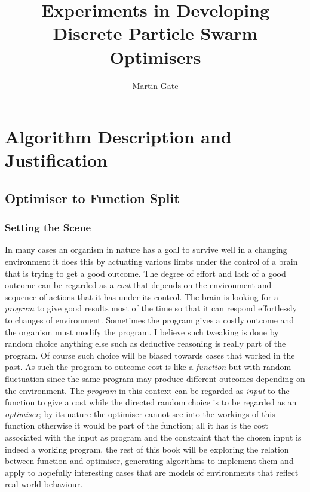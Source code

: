 \documentclass[a4paper,oneside,english]{book}
\numberwithin{equation}{section}
\numberwithin{figure}{section}
\begin{document}
	\title{Experiments in Developing Discrete Particle Swarm Optimisers}
	\author{Martin Gate}
	\maketitle
	\tableofcontents\newpage
	
	\part[Algorithms]{Algorithm Description and Justification}
	\chapter{Optimiser to Function Split}
	\section{Setting the  Scene}
	In many cases an organism in nature has a goal to survive well in a changing environment it does this by actuating various limbs under the control of a brain that is trying to get a good outcome. The degree of effort and lack of a good outcome  can be regarded as a \emph{cost} that depends on the  environment  and sequence of actions that it has under its control. The brain is looking for a \emph{program}  to give good results most of the time so that it can respond effortlessly to changes of environment. Sometimes the program gives a costly outcome and the organism must modify the program. I believe such tweaking is done by random choice anything else such as deductive reasoning is really part of the program. Of course such choice will be biased towards cases that worked in the past. As such the  program to outcome cost is like a \emph{function } but with random fluctuation since the  same program may produce different outcomes depending on the environment. The \emph{program} in this context can be regarded as \emph{input} to the function to give a cost while the directed random choice is to be regarded as an \emph{optimiser}; by its nature the optimiser cannot see into the workings of this function otherwise it would be part of the function; all it has is the cost associated with the input as program and the constraint that the chosen input is indeed a working program. the rest of this book will be exploring the relation between function and optimiser, generating algorithms to implement them and apply  to hopefully interesting  cases that are models of environments that reflect real world behaviour.
	
\end{document}
